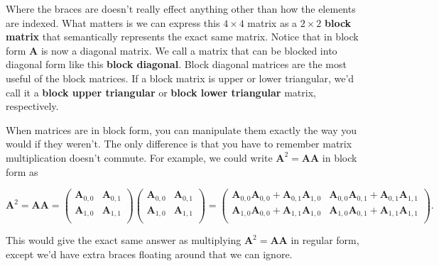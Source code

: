 \documentclass[
  letterpaper,
  DIV=11,
  numbers=noendperiod]{scrreprt}
\begin{document}
Where the braces are doesn't really effect anything other than how the
elements are indexed. What matters is we can express this \(4 \times 4\)
matrix as a \(2 \times 2\) \textbf{block matrix} that semantically
represents the exact same matrix. Notice that in block form
\(\mathbf{A}\) is now a diagonal matrix. We call a matrix that can be
blocked into diagonal form like this \textbf{block diagonal}. Block
diagonal matrices are the most useful of the block matrices. If a block
matrix is upper or lower triangular, we'd call it a \textbf{block upper
triangular} or \textbf{block lower triangular} matrix, respectively.

When matrices are in block form, you can manipulate them exactly the way
you would if they weren't. The only difference is that you have to
remember matrix multiplication doesn't commute. For example, we could
write \(\mathbf{A}^2 = \mathbf{A}\mathbf{A}\) in block form as

\[
\mathbf{A}^2 = \mathbf{A}\mathbf{A} = 
\begin{pmatrix}
\mathbf{A}_{0,0} & \mathbf{A}_{0,1} \\
\mathbf{A}_{1,0} & \mathbf{A}_{1,1} \\
\end{pmatrix}
\begin{pmatrix}
\mathbf{A}_{0,0} & \mathbf{A}_{0,1} \\
\mathbf{A}_{1,0} & \mathbf{A}_{1,1} \\
\end{pmatrix} = 
\begin{pmatrix}
\mathbf{A}_{0,0}\mathbf{A}_{0,0} + \mathbf{A}_{0,1}\mathbf{A}_{1,0}  & \mathbf{A}_{0,0}\mathbf{A}_{0,1} + \mathbf{A}_{0,1}\mathbf{A}_{1,1} \\
\mathbf{A}_{1,0}\mathbf{A}_{0,0} + \mathbf{A}_{1,1}\mathbf{A}_{1,0} & \mathbf{A}_{1,0}\mathbf{A}_{0,1} + \mathbf{A}_{1,1}\mathbf{A}_{1,1} \\
\end{pmatrix}.
\]

This would give the exact same answer as multiplying
\(\mathbf{A}^2 = \mathbf{A}\mathbf{A}\) in regular form, except we'd
have extra braces floating around that we can ignore.
\end{document}

